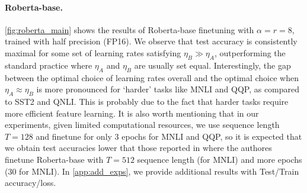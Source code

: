 \paragraph{Roberta-base.} \cref{fig:roberta_main} shows the results of Roberta-base finetuning with $\alpha = r=8$, trained with half precision (FP16). We observe that test accuracy is consistently maximal for some set of learning rates satisfying $\eta_B \gg \eta_A$, outperforming the standard practice where $\eta_A$ and $\eta_B$ are usually set equal. Interestingly, the gap between the optimal choice of learning rates overall and the optimal choice when $\eta_A \approx \eta_B$ is more pronounced for `harder' tasks like MNLI and QQP, as compared to SST2 and QNLI. This is probably due to the fact that harder tasks require more efficient feature learning. It is also worth mentioning that in our experiments, given limited computational resources, we use sequence length $T=128$ and finetune for only $3$ epochs for MNLI and QQP, so it is expected that we obtain test accuracies lower that those reported in \cite{hu2021lora} where the authores finetune Roberta-base with $T=512$ sequence length (for MNLI) and more epochs ($30$ for MNLI). In \cref{app:add_exps}, we provide additional results with Test/Train accuracy/loss.
